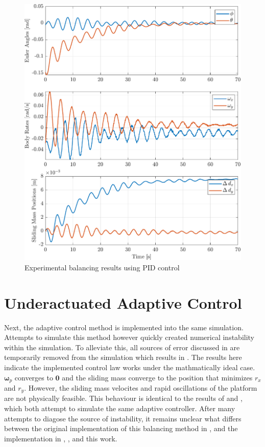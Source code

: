 \begin{figure}[!ht]
    \centering
    \includegraphics[width=\linewidth]{plots/PID_hardware_results.pdf}
    \caption{Experimental balancing results using PID control}
    \label{fig:PID_hardware_results}
\end{figure}

\section{Underactuated Adaptive Control}

Next, the adaptive control method is implemented into the same simulation. Attempts to simulate this method however quickly created numerical instability within the simulation. To alleviate this, all sources of error discussed in  are temporarily removed from the simulation which results in . The results here indicate the implemented control law works under the mathmatically ideal case. $\bm{\omega}_p$ converges to $\bm{0}$ and the sliding mass converge to the position that minimizes $r_x$ and $r_y$. However, the sliding mass velocites and rapid oscillations of the platform are not physically feasible. This behaviour is identical to the results of \cite{silva_filtering_2018} and \cite{hudson_dynamic_2019}, which both attempt to simulate the same adaptive controller. After many attempts to diagose the source of instability, it remains unclear what differs between the original implementation of this balancing method in \cite{chesi_automatic_2014}, and the implementation in \cite{silva_filtering_2018}, \cite{hudson_dynamic_2019}, and this work.

